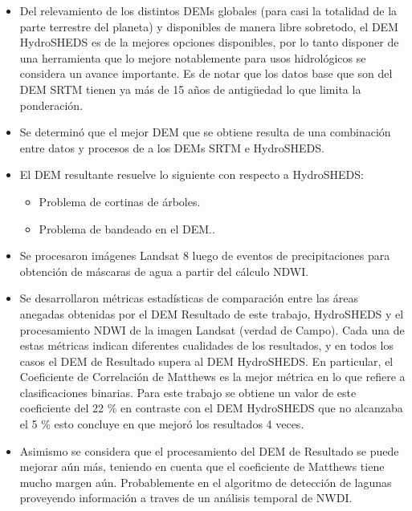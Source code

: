 \documentclass[10pt,a4paper, twoside]{report}
\begin{document}
\begin{itemize}

		\item Del relevamiento de los distintos DEMs globales (para casi la totalidad de la parte terrestre del planeta) y disponibles de manera libre sobretodo, el DEM HydroSHEDS es de la mejores opciones disponibles, por lo tanto disponer de una herramienta que lo mejore notablemente para usos hidrológicos se considera un avance importante. Es de notar que los datos base que son del DEM SRTM tienen ya más de 15 años de antigüedad lo que limita la ponderación.

	\item Se determinó que el mejor DEM que se obtiene resulta de una combinación entre datos y procesos de a los DEMs SRTM e HydroSHEDS.

	
	\item El DEM resultante resuelve lo siguiente con respecto a HydroSHEDS:	
		\begin{itemize}
			\item Problema de cortinas de árboles.
			\item Problema de bandeado en el DEM..
		\end{itemize}		
	
		\item Se procesaron imágenes Landsat 8 luego de eventos de precipitaciones para obtención de máscaras de agua a partir del cálculo NDWI.
	
			\item Se desarrollaron métricas estadísticas de comparación entre las áreas anegadas obtenidas por el DEM Resultado de este trabajo, HydroSHEDS y el procesamiento NDWI de la imagen Landsat (verdad de Campo). Cada una de estas métricas indican diferentes cualidades de los resultados, y en todos los casos el DEM de Resultado supera al DEM HydroSHEDS. En particular, el Coeficiente de Correlación de Matthews es la mejor métrica en lo que refiere a clasificaciones binarias. Para este trabajo se obtiene un valor de este coeficiente del 22 \% en contraste con el DEM HydroSHEDS que no alcanzaba el 5 \% esto concluye en que mejoró los resultados 4 veces. 			
			\item Asimismo se considera que el procesamiento del DEM de Resultado se puede mejorar aún más, teniendo en cuenta que el coeficiente de Matthews tiene mucho margen aún. Probablemente en el algoritmo de detección de lagunas proveyendo información a traves de un análisis temporal de NWDI.


\end{itemize}
\end{document}

